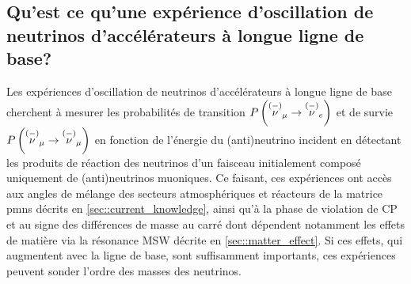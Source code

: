 
    \subsection{Qu'est ce qu'une expérience d'oscillation de neutrinos d'accélérateurs à longue ligne de base?}

      Les expériences d'oscillation de neutrinos d'accélérateurs à longue ligne de base cherchent à mesurer les probabilités de transition $P\left(\overset{(-)}{\nu}_{\mu}\to \overset{(-)}{\nu}_e\right)$ et de survie $P\left(\overset{(-)}{\nu}_{\mu}\to \overset{(-)}{\nu}_{\mu}\right)$ en fonction de l'énergie du (anti)neutrino incident en détectant les produits de réaction des neutrinos d'un faisceau initialement composé uniquement de (anti)neutrinos muoniques. Ce faisant, ces expériences ont accès aux angles de mélange des secteurs atmosphériques et réacteurs de la matrice \gls{pmns} décrits en \autoref{sec::current_knowledge}, ainsi qu'à la phase de violation de CP et au signe des différences de masse au carré dont dépendent notamment les effets de matière via la résonance MSW décrite en \autoref{sec::matter_effect}. Si ces effets, qui augmentent avec la ligne de base, sont suffisamment importants, ces expériences peuvent sonder l'ordre des masses des neutrinos.
    
